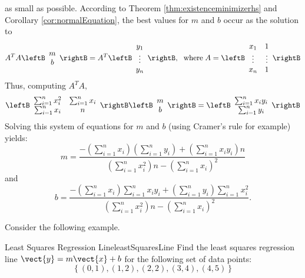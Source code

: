 as small as possible. According to Theorem \ref{thm:existenceminimizerhs} and
Corollary \ref{cor:normalEquation}, the best values for $m$ and $b$ occur as the
solution to 
\begin{equation*}
A^{T}A\leftB 
\begin{array}{c}
m \\ 
b
\end{array}
\rightB =A^{T}\leftB 
\begin{array}{c}
y_{1} \\ 
\vdots \\ 
y_{n}
\end{array}
\rightB ,\ \;\mbox{where}\; A=\leftB
\begin{array}{cc}
x_{1} & 1 \\ 
\vdots & \vdots \\ 
x_{n} & 1
\end{array}
\rightB 
\end{equation*}
Thus, computing $A^{T}A,$ 
\begin{equation*}
\leftB 
\begin{array}{cc}
\sum_{i=1}^{n}x_{i}^{2} & \sum_{i=1}^{n}x_{i} \\ 
\sum_{i=1}^{n}x_{i} & n
\end{array}
\rightB \leftB 
\begin{array}{c}
m \\ 
b
\end{array}
\rightB =\leftB 
\begin{array}{c}
\sum_{i=1}^{n}x_{i}y_{i} \\ 
\sum_{i=1}^{n}y_{i}
\end{array}
\rightB
\end{equation*}
Solving this system of equations for $m$ and $b$ (using Cramer's rule for example) yields: 
\begin{equation*}
m=
\frac{-\left( \sum_{i=1}^{n}x_{i}\right) \left( \sum_{i=1}^{n}y_{i}\right)
+\left( \sum_{i=1}^{n}x_{i}y_{i}\right) n}{\left(
\sum_{i=1}^{n}x_{i}^{2}\right) n-\left( \sum_{i=1}^{n}x_{i}\right) ^{2}}
\end{equation*}
and 
\begin{equation*}
b=\frac{-\left( \sum_{i=1}^{n}x_{i}\right) \sum_{i=1}^{n}x_{i}y_{i}+\left(
\sum_{i=1}^{n}y_{i}\right) \sum_{i=1}^{n}x_{i}^{2}}{\left(
\sum_{i=1}^{n}x_{i}^{2}\right) n-\left( \sum_{i=1}^{n}x_{i}\right) ^{2}}.
\end{equation*}

Consider the following example.

\begin{example}{Least Squares Regression Line}{leastSquaresLine}
Find the least squares regression line $\vect{y}=m\vect{x}+b$ for the following set of data points:
\[ \left\{ (0,1), (1,2), (2,2), (3,4), (4,5) \right\} \]
\end{example}


